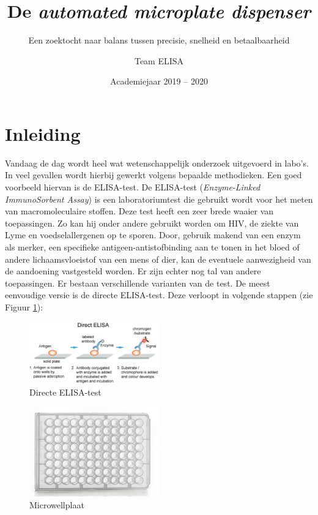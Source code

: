 \documentclass[a4paper,twoside,kulak]{kulakreport} %
\title{De \textit{automated microplate dispenser}}
\subtitle{Een zoektocht naar balans tussen precisie, snelheid en betaalbaarheid}
\author{Team ELISA}
\institute{Matthias Derez, Maxime Dujardin, Korneel Verkens, Seppe Vilain}
\date{Academiejaar 2019 -- 2020}
\begin{document}

\titlepage

\tableofcontents

\chapter*{Inleiding}

Vandaag de dag wordt heel wat wetenschappelijk onderzoek uitgevoerd in labo's. In veel gevallen wordt hierbij gewerkt volgens bepaalde methodieken. Een goed voorbeeld hiervan is de ELISA-test. De ELISA-test (\textit{Enzyme-Linked ImmunoSorbent Assay}\cite{naamELISA}) is een laboratoriumtest die gebruikt wordt voor het meten van macromoleculaire stoffen. Deze test heeft een zeer brede waaier van toepassingen. Zo kan hij onder andere gebruikt worden om HIV, de ziekte van Lyme en voedselallergenen op te sporen. Door, gebruik makend van een enzym als merker, een specifieke antigeen-antistofbinding aan te tonen in het bloed of andere lichaamsvloeistof van een mens of dier, kan de eventuele aanwezigheid van de aandoening vastgesteld worden. Er zijn echter nog tal van andere toepassingen\cite{ELISAApplications}.  
\newline
Er bestaan verschillende varianten van de test. De meest eenvoudige versie is de directe ELISA-test. Deze verloopt in volgende stappen (zie Figuur \ref{fig: directe ELISA})\cite{AfbeeldingdirectELISA}:

\begin{figure}[h]
	\centering
	\includegraphics[width=0.5\textwidth]{ELISA.png}
	\caption{Directe ELISA-test}
	\label{fig: directe ELISA}
	
\end{figure} 


\begin{figure}[h]
	\centering
	\includegraphics[width=0.5\textwidth]{microplate.png}
	\caption{Microwellplaat}
	\label{fig: microwellplaat}
	
\end{figure} 
\end{document}
